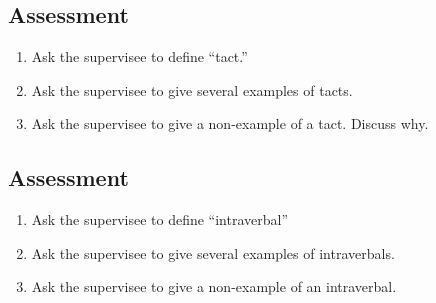 \subsection{Assessment}
\begin{enumerate}
\item Ask the supervisee to define ``tact.''  
\item Ask the supervisee to give several examples of tacts.
\item Ask the supervisee to give a non-example of a tact. Discuss why.
%
\end{enumerate}
%
\subsection{Assessment}
\begin{enumerate}
\item Ask the supervisee to define ``intraverbal''  
\item Ask the supervisee to give several examples of intraverbals.
\item Ask the supervisee to give a non-example of an intraverbal.
%
\end{enumerate}
%
